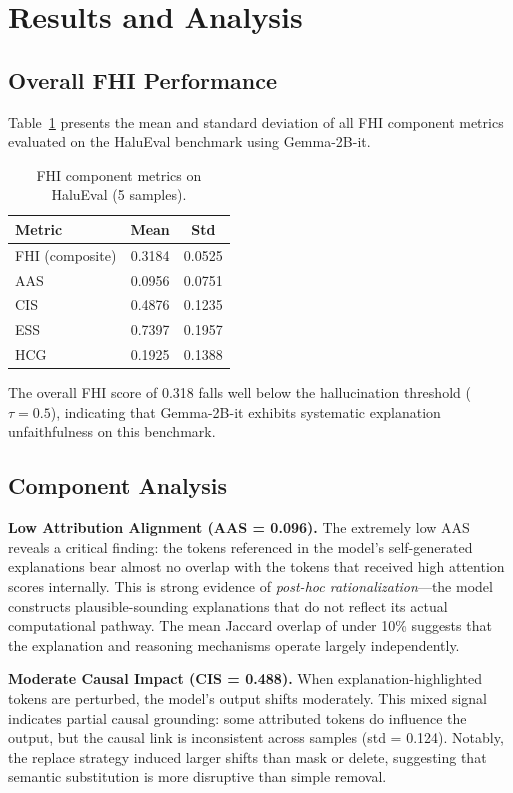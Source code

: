 \section{Results and Analysis}
\label{sec:results}

\subsection{Overall FHI Performance}

Table~\ref{tab:main_results} presents the mean and standard deviation of all FHI component metrics evaluated on the HaluEval benchmark using Gemma-2B-it.

\begin{table}[h]
\centering
\caption{FHI component metrics on HaluEval (5 samples).}
\label{tab:main_results}
\begin{tabular}{lcc}
\toprule
\textbf{Metric} & \textbf{Mean} & \textbf{Std} \\
\midrule
FHI (composite) & 0.3184 & 0.0525 \\
AAS & 0.0956 & 0.0751 \\
CIS & 0.4876 & 0.1235 \\
ESS & 0.7397 & 0.1957 \\
HCG & 0.1925 & 0.1388 \\
\bottomrule
\end{tabular}
\end{table}

The overall FHI score of 0.318 falls well below the hallucination threshold ($\tau = 0.5$), indicating that Gemma-2B-it exhibits systematic explanation unfaithfulness on this benchmark.

\subsection{Component Analysis}

\textbf{Low Attribution Alignment (AAS = 0.096).} The extremely low AAS reveals a critical finding: the tokens referenced in the model's self-generated explanations bear almost no overlap with the tokens that received high attention scores internally. This is strong evidence of \textit{post-hoc rationalization}---the model constructs plausible-sounding explanations that do not reflect its actual computational pathway. The mean Jaccard overlap of under 10\% suggests that the explanation and reasoning mechanisms operate largely independently.

\textbf{Moderate Causal Impact (CIS = 0.488).} When explanation-highlighted tokens are perturbed, the model's output shifts moderately. This mixed signal indicates partial causal grounding: some attributed tokens do influence the output, but the causal link is inconsistent across samples (std = 0.124). Notably, the replace strategy induced larger shifts than mask or delete, suggesting that semantic substitution is more disruptive than simple removal.

